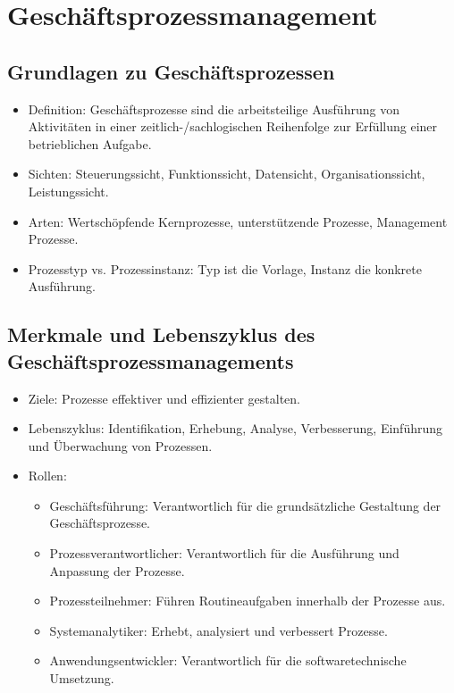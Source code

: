 \section{Geschäftsprozessmanagement}

\subsection{Grundlagen zu Geschäftsprozessen}
\begin{itemize}
    \item Definition: Geschäftsprozesse sind die arbeitsteilige Ausführung von Aktivitäten in einer zeitlich-/sachlogischen Reihenfolge zur Erfüllung einer betrieblichen Aufgabe.
    \item Sichten: Steuerungssicht, Funktionssicht, Datensicht, Organisationssicht, Leistungssicht.
    \item Arten: Wertschöpfende Kernprozesse, unterstützende Prozesse, Management Prozesse.
    \item Prozesstyp vs. Prozessinstanz: Typ ist die Vorlage, Instanz die konkrete Ausführung.
\end{itemize}

\subsection{Merkmale und Lebenszyklus des Geschäftsprozessmanagements}
\begin{itemize}
    \item Ziele: Prozesse effektiver und effizienter gestalten.
    \item Lebenszyklus: Identifikation, Erhebung, Analyse, Verbesserung, Einführung und Überwachung von Prozessen.
    \item Rollen:
    \begin{itemize}
        \item Geschäftsführung: Verantwortlich für die grundsätzliche Gestaltung der Geschäftsprozesse.
        \item Prozessverantwortlicher: Verantwortlich für die Ausführung und Anpassung der Prozesse.
        \item Prozessteilnehmer: Führen Routineaufgaben innerhalb der Prozesse aus.
        \item Systemanalytiker: Erhebt, analysiert und verbessert Prozesse.
        \item Anwendungsentwickler: Verantwortlich für die softwaretechnische Umsetzung.
    \end{itemize}
\end{itemize}

